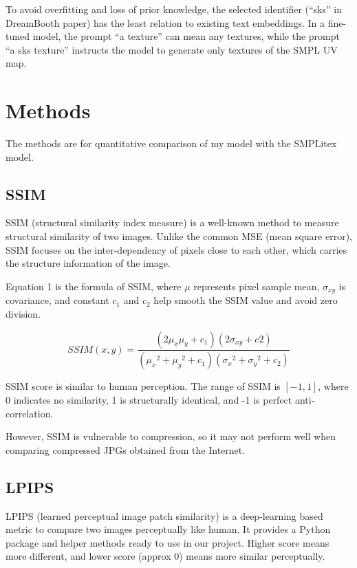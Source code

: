 \documentclass[acmtog]{acmart}
\begin{document}
To avoid overfitting and loss of prior knowledge, the selected identifier (``sks'' in DreamBooth paper) has the least relation to existing text embeddings. In a fine-tuned model, the prompt ``a texture'' can mean any textures, while the prompt ``a sks texture'' instructs the model to generate only textures of the SMPL UV map.

\section{Methods}

The methods are for quantitative comparison of my model with the SMPLitex model.

\subsection{SSIM}

SSIM (structural similarity index measure) is a well-known method to measure structural similarity of two images. Unlike the common MSE (mean square error), SSIM focuses on the inter-dependency of pixels close to each other, which carries the structure information of the image.

Equation 1 is the formula of SSIM, where \(\mu\) represents pixel sample mean, \(\sigma_{xy}\) is covariance, and constant \(c_1\) and \(c_2\) help smooth the SSIM value and avoid zero division.

\begin{equation}
  SSIM(x,y)=\frac{(2\mu_x\mu_y+c_1)(2\sigma_{xy}+c2)}{({\mu_x}^2+{\mu_y}^2+c_1)({\sigma_x}^2+{\sigma_y}^2+c_2)}
\end{equation}

SSIM score is similar to human perception. The range of SSIM is \([-1,1]\), where 0 indicates no similarity, 1 is structurally identical, and -1 is perfect anti-correlation.

However, SSIM is vulnerable to compression, so it may not perform well when comparing compressed JPGs obtained from the Internet.

\subsection{LPIPS}

LPIPS (learned perceptual image patch similarity) \cite{zhang2018unreasonable} is a deep-learning based metric to compare two images perceptually like human. It provides a Python package and helper methods ready to use in our project. Higher score means more different, and lower score (approx 0) means more similar perceptually.
\end{document}
